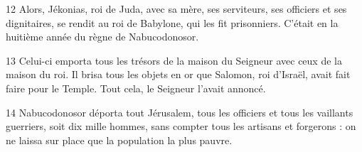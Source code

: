 
12 Alors, Jékonias, roi de Juda, avec sa mère, ses serviteurs, ses officiers et ses dignitaires, se rendit au roi de Babylone, qui les fit prisonniers. C’était en la huitième année du règne de Nabucodonosor.

13 Celui-ci emporta tous les trésors de la maison du Seigneur avec ceux de la maison du roi. Il brisa tous les objets en or que Salomon, roi d’Israël, avait fait faire pour le Temple. Tout cela, le Seigneur l’avait annoncé.

14 Nabucodonosor déporta tout Jérusalem, tous les officiers et tous les vaillants guerriers, soit dix mille hommes, sans compter tous les artisans et forgerons : on ne laissa sur place que la population la plus pauvre.
